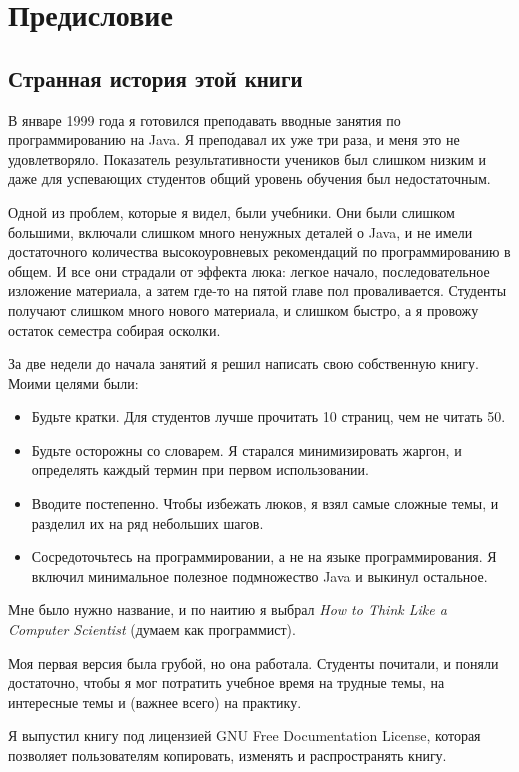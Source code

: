\chapter{Предисловие}

\section{Странная история этой книги}

В январе 1999 года я готовился преподавать вводные занятия по программированию
на Java. Я преподавал их уже три раза, и меня это не удовлетворяло. Показатель
результативности учеников был слишком низким и даже для успевающих студентов
общий уровень обучения был недостаточным.

Одной из проблем, которые я видел, были учебники. Они были слишком большими,
включали слишком много ненужных деталей о Java, и не имели достаточного
количества высокоуровневых рекомендаций по программированию в общем. И все они
страдали от эффекта люка: легкое начало, последовательное изложение материала, а
затем где-то на пятой главе пол проваливается. Студенты получают слишком много
нового материала, и слишком быстро, а я провожу остаток семестра собирая
осколки.

За две недели до начала занятий я решил написать свою собственную книгу.
Моими целями были:

\begin{itemize}
\item Будьте кратки. Для студентов лучше прочитать 10 страниц, чем не читать 50.
\item Будьте осторожны со словарем. Я старался минимизировать жаргон, и
определять каждый термин при первом использовании.
\item Вводите постепенно. Чтобы избежать люков, я взял самые сложные темы, и
разделил их на ряд небольших шагов.
\item Сосредоточьтесь на программировании, а не на языке программирования.
Я включил минимальное полезное подмножество Java и выкинул остальное.
\end{itemize}

Мне было нужно название, и по наитию я выбрал \emph{How to Think Like a Computer
Scientist} (думаем как программист).

Моя первая версия была грубой, но она работала. Студенты почитали, и поняли
достаточно, чтобы я мог потратить учебное время на трудные темы, на интересные
темы и (важнее всего) на практику.

Я выпустил книгу под лицензией GNU Free Documentation License, которая позволяет
пользователям копировать, изменять и распространять книгу.

